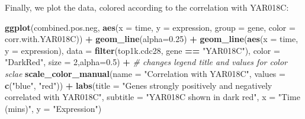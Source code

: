 \documentclass[]{book}
\newenvironment{Shaded}{\begin{snugshade}}{\end{snugshade}}
\newcommand{\CommentTok}[1]{\textcolor[rgb]{0.56,0.35,0.01}{\textit{#1}}}
\newcommand{\DataTypeTok}[1]{\textcolor[rgb]{0.13,0.29,0.53}{#1}}
\newcommand{\DecValTok}[1]{\textcolor[rgb]{0.00,0.00,0.81}{#1}}
\newcommand{\FloatTok}[1]{\textcolor[rgb]{0.00,0.00,0.81}{#1}}
\newcommand{\KeywordTok}[1]{\textcolor[rgb]{0.13,0.29,0.53}{\textbf{#1}}}
\newcommand{\NormalTok}[1]{#1}
\newcommand{\OperatorTok}[1]{\textcolor[rgb]{0.81,0.36,0.00}{\textbf{#1}}}
\newcommand{\StringTok}[1]{\textcolor[rgb]{0.31,0.60,0.02}{#1}}
\theoremstyle{definition}
\theoremstyle{definition}
\theoremstyle{definition}
\theoremstyle{remark}
\begin{document}
\begin{Shaded}
\end{Shaded}

Finally, we plot the data, colored according to the correlation with
YAR018C:

\begin{Shaded}
\begin{Highlighting}[]
\KeywordTok{ggplot}\NormalTok{(combined.pos.neg, }
       \KeywordTok{aes}\NormalTok{(}\DataTypeTok{x =}\NormalTok{ time, }\DataTypeTok{y =}\NormalTok{ expression,  }\DataTypeTok{group =}\NormalTok{ gene,}
           \DataTypeTok{color =}\NormalTok{ corr.with.YAR018C)) }\OperatorTok{+}\StringTok{ }
\StringTok{  }\KeywordTok{geom_line}\NormalTok{(}\DataTypeTok{alpha=}\FloatTok{0.25}\NormalTok{) }\OperatorTok{+}\StringTok{ }
\StringTok{  }\KeywordTok{geom_line}\NormalTok{(}\KeywordTok{aes}\NormalTok{(}\DataTypeTok{x =}\NormalTok{ time, }\DataTypeTok{y =}\NormalTok{ expression),}
            \DataTypeTok{data =} \KeywordTok{filter}\NormalTok{(top1k.cdc28, gene }\OperatorTok{==}\StringTok{ "YAR018C"}\NormalTok{),}
            \DataTypeTok{color =} \StringTok{"DarkRed"}\NormalTok{, }\DataTypeTok{size =} \DecValTok{2}\NormalTok{,}\DataTypeTok{alpha=}\FloatTok{0.5}\NormalTok{) }\OperatorTok{+}
\StringTok{  }\CommentTok{# changes legend title and values for color sclae}
\StringTok{  }\KeywordTok{scale_color_manual}\NormalTok{(}\DataTypeTok{name =} \StringTok{"Correlation with YAR018C"}\NormalTok{,}
                       \DataTypeTok{values =} \KeywordTok{c}\NormalTok{(}\StringTok{"blue"}\NormalTok{, }\StringTok{"red"}\NormalTok{))  }\OperatorTok{+}\StringTok{ }
\StringTok{  }\KeywordTok{labs}\NormalTok{(}\DataTypeTok{title =} \StringTok{"Genes strongly positively and negatively correlated with YAR018C"}\NormalTok{,}
       \DataTypeTok{subtitle =} \StringTok{"YAR018C shown in dark red"}\NormalTok{,}
       \DataTypeTok{x =} \StringTok{"Time (mins)"}\NormalTok{, }\DataTypeTok{y =} \StringTok{"Expression"}\NormalTok{)}
\end{Highlighting}
\end{Shaded}
\end{document}
